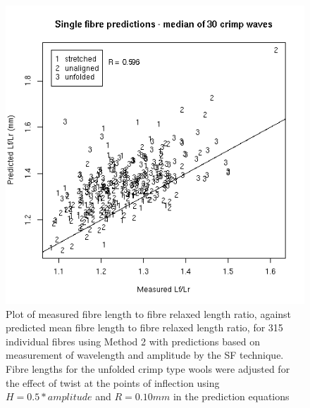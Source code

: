 %

\begin{figure}[!h]
  \centering
  \includegraphics[width=1.1\textwidth]{figfibrelftolr.png}
  \caption{Plot of measured fibre length to fibre relaxed length ratio, against predicted mean fibre length to fibre relaxed length ratio, for 315 individual fibres using Method 2 with predictions based on measurement of wavelength and amplitude by the SF technique. Fibre lengths for the unfolded crimp type wools were adjusted for the effect of twist at the points of inflection using $H = 0.5 * amplitude$ and $R = 0.10 mm$ in the prediction equations }
  \label{fig:fibrelftolr}
\end{figure}

%

